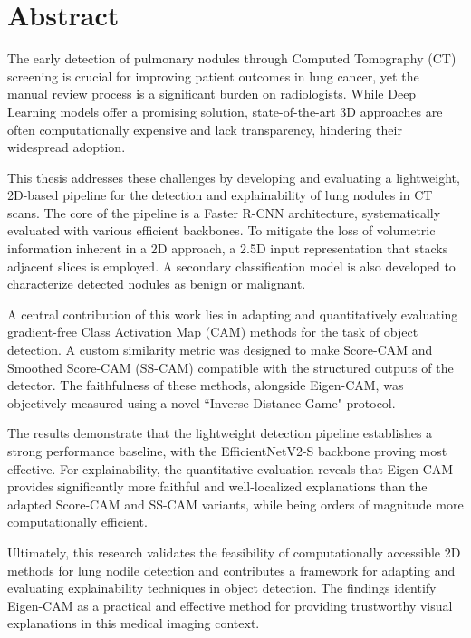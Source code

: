 \documentclass{book}
\begin{document}
\fontsize{11.5pt}{14pt}\selectfont
 

\cleardoublepage
{}
\chapter*{Abstract}
    The early detection of pulmonary nodules through Computed Tomography (CT) screening is crucial for improving patient outcomes in lung cancer, yet the manual review process is a significant burden on radiologists. While Deep Learning models offer a promising solution, state-of-the-art 3D approaches are often computationally expensive and lack transparency, hindering their widespread adoption.

    This thesis addresses these challenges by developing and evaluating a lightweight, 2D-based pipeline for the detection and explainability of lung nodules in CT scans. The core of the pipeline is a Faster R-CNN architecture, systematically evaluated with various efficient backbones. To mitigate the loss of volumetric information inherent in a 2D approach, a 2.5D input representation that stacks adjacent slices is employed. A secondary classification model is also developed to characterize detected nodules as benign or malignant.

    A central contribution of this work lies in adapting and quantitatively evaluating gradient-free Class Activation Map (CAM) methods for the task of object detection. A custom similarity metric was designed to make Score-CAM and Smoothed Score-CAM (SS-CAM) compatible with the structured outputs of the detector. The faithfulness of these methods, alongside Eigen-CAM, was objectively measured using a novel ``Inverse Distance Game" protocol.

    The results demonstrate that the lightweight detection pipeline establishes a strong performance baseline, with the EfficientNetV2-S backbone proving most effective. For explainability, the quantitative evaluation reveals that Eigen-CAM provides significantly more faithful and well-localized explanations than the adapted Score-CAM and SS-CAM variants, while being orders of magnitude more computationally efficient.

    Ultimately, this research validates the feasibility of computationally accessible 2D methods for lung nodile detection and contributes a framework for adapting and evaluating explainability techniques in object detection. The findings identify Eigen-CAM as a practical and effective method for providing trustworthy visual explanations in this medical imaging context.

\frontmatter
\cleardoublepage
\tableofcontents

\mainmatter














\end{document}
